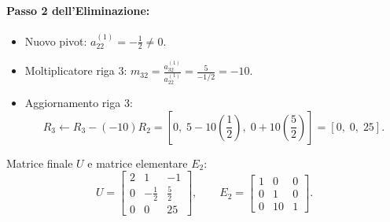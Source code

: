 \paragraph{Passo 2 dell'Eliminazione:}
\begin{itemize}
    \item Nuovo pivot: $a_{22}^{(1)} = -\frac{1}{2} \neq 0$.
    \item Moltiplicatore riga 3: $m_{32} = \frac{a_{32}^{(1)}}{a_{22}^{(1)}} = \frac{5}{-1/2} = -10$.
    \item Aggiornamento riga 3:
    \begin{equation}
        R_3 \leftarrow R_3 - (-10) R_2 = \left[0, \; 5 - 10\left(\frac{1}{2}\right), \; 0 + 10\left(\frac{5}{2}\right)\right] = [0, \; 0, \; 25].
    \end{equation}
\end{itemize}
Matrice finale $U$ e matrice elementare $E_2$:
\begin{equation}
    U = \begin{bmatrix}
        2 & 1 & -1 \\
        0 & -\frac{1}{2} & \frac{5}{2} \\
        0 & 0 & 25
    \end{bmatrix}, \qquad
    E_2 = \begin{bmatrix}
        1 & 0 & 0 \\
        0 & 1 & 0 \\
        0 & 10 & 1
    \end{bmatrix}.
\end{equation}

